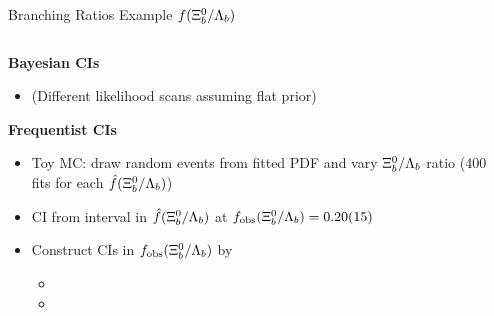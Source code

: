 \begin{frame}{Branching Ratios \textemdash Example $f({{\Xi}^0_{b}}/{{\Lambda}_{b}})$}
    \begin{columns}
        \begin{column}{.5\textwidth}
            \textbf{Bayesian CIs}
            \begin{itemize}
                \item (Different likelihood scans assuming flat prior\ftntdagger)
            \end{itemize}

            \textbf{Frequentist CIs}
            \begin{itemize}
                \item Toy MC: draw random events from fitted PDF and vary ${{\Xi}^0_{b}} / {{\Lambda}_{b}}$ ratio (400 fits for each $\hat{f}({{\Xi}^0_{b}}/{{\Lambda}_{b}})$)
                \item CI from interval in $\hat{f}({{\Xi}^0_{b}}/{{\Lambda}_{b}})$ at $f_\text{obs}({{\Xi}^0_{b}}/{{\Lambda}_{b}}) = 0.20(15)$
                \item Construct CIs in $f_\text{obs}({{\Xi}^0_{b}}/{{\Lambda}_{b}})$ by
                \begin{itemize}
                    \item {}
                    \item {}
                \end{itemize}
            \end{itemize}
        \end{column}
        \begin{column}{.5\textwidth}
            \centering
        \end{column}
    \end{columns}
\end{frame}

